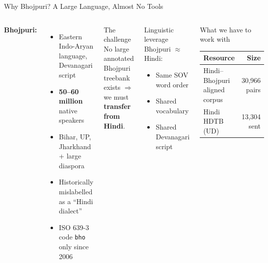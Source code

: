 \documentclass[aspectratio=169,10pt]{beamer}
\newcommand{\bho}{Bhojpuri}
\newcommand{\hi}{Hindi}
\begin{document}
\begin{frame}{Why \bho{}? A Large Language, Almost No Tools}
\begin{columns}[T]
\textbf{\bho{}:}
\begin{itemize}
  \item Eastern Indo-Aryan language, Devanagari script
  \item \textbf{50--60 million} native speakers
  \item Bihar, UP, Jharkhand + large diaspora
  \item Historically mislabelled as a ``Hindi dialect''
  \item ISO 639-3 code \texttt{bho} only since 2006
\end{itemize}

\vspace{0.3cm}
\begin{alertblock}{The challenge}
No large annotated \bho{} treebank exists $\Rightarrow$ we must \textbf{transfer from \hi{}}.
\end{alertblock}

\begin{block}{Linguistic leverage}
\bho{} $\approx$ \hi{}:
\begin{itemize}\small
  \item Same SOV word order
  \item Shared vocabulary
  \item Shared Devanagari script
\end{itemize}
\end{block}

\vspace{0.3cm}
\begin{block}{What we have to work with}
\small
\begin{tabular}{@{}lr@{}}
\toprule
\textbf{Resource} & \textbf{Size} \\
\midrule
\hi{}--\bho{} aligned corpus & 30{,}966 pairs \\
\hi{} HDTB (UD)              & 13{,}304 sent \\
\bottomrule
\end{tabular}
\end{block}
\end{columns}
\end{frame}
\end{document}
